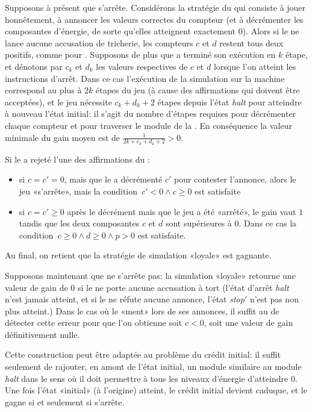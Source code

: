 Supposons à présent que \machine s'arrête.
Considérons la stratégie du \jo qui consiste à jouer honnêtement, \cad à annoncer les valeurs correctes du compteur (et à décrémenter les composantes d'énergie, de sorte qu'elles atteignent exactement $0$).
Alors si le \ji ne lance aucune accusation de tricherie, les compteurs $c$ et $d$ restent tous deux positifs, comme pour \machine.
Supposons de plus que \machine a terminé son exécution en $k$ étape, et dénotons par $c_k$ et $d_k$ les valeurs respectives de $c$ et $d$ lorsque l'on atteint les instructions d'arrêt.
Dans ce cas l'exécution de la simulation sur la machine correspond au plus à $2k$ étapes du jeu (à cause des affirmations qui doivent être acceptées), et le jeu nécessite $c_k+d_k+2$ étapes depuis l'état \emph{halt} pour atteindre à nouveau l'état initial: il s'agit du nombre d'étapes requises pour décrémenter chaque compteur et pour traverser le module de la .
En conséquence la valeur minimale du gain moyen est de $\frac1{2k+c_k+d_k+2}>0$.

Si le \ji a rejeté l'une des affirmations du \jo:
\begin{itemize}
\item si $c=c'=0$, mais que le \ji a décrémenté $c'$ pour contester l'annonce, alors le jeu «s'arrête», mais la condition~$c'<0 \wedge c\geq0$ est satisfaite
\item si $c=c'\geq0$ après le décrément mais que le jeu a été «arrêté», le gain vaut $1$ tandis que les deux composantes $c$ et $d$ sont supérieures à $0$. Dans ce cas la condition~$c\geq0 \wedge d\geq0 \wedge p>0$ est satisfaite.
\end{itemize}

Au final, on retient que la stratégie de simulation «loyale» est gagnante.

\bigskip

Supposons maintenant que \machine ne s'arrête pas: la simulation «loyale» retourne une valeur de gain de $0$ si le \ji ne porte aucune accusation à tort (l'état d'arrêt \emph{halt} n'est jamais atteint, et si le \ji ne réfute aucune annonce, l'état \emph{stop$'$} n'est pas non plus atteint.)
Dans le cas où le \jo «ment» lors de ses annonces, il suffit au \ji de détecter cette erreur pour que l'on obtienne soit $c<0$, soit une valeur de gain définitivement nulle.

\bigskip

Cette construction peut être adaptée au problème du crédit initial: il suffit seulement de rajouter, en amont de l'état initial, un module similaire au module \emph{halt} dans le sens où il doit permettre à tous les niveaux d'énergie d'atteindre $0$.
Une fois l'état «initial» (à l'origine) atteint, le crédit initial devient caduque, et le \jo gagne si et seulement si \machine s'arrête.

